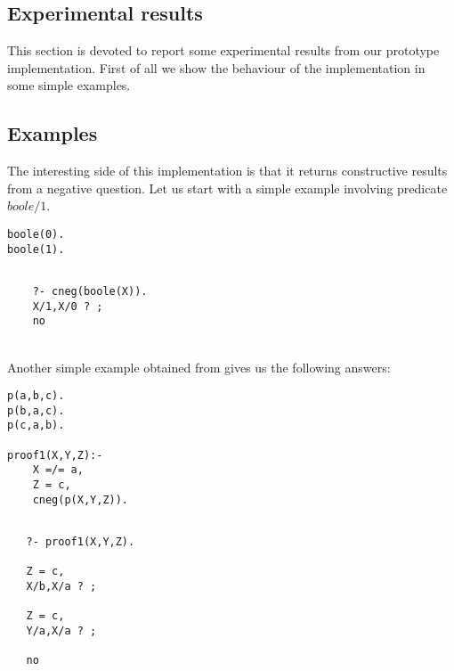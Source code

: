 \documentclass{llncs}
\begin{document}
\subsection{Experimental results}
\label{results}
This section is devoted to report some experimental results from our
prototype implementation.  First of all we show the behaviour of the
implementation in some simple examples.


\subsection{Examples}
\label{examples}

The interesting side of this implementation is that it returns
constructive results from a negative question. Let us start with a
simple example involving predicate $boole/1$.

\begin{minipage}{2in}
\begin{verbatim}
boole(0).
boole(1).
\end{verbatim}
\end{minipage}
\begin{minipage}{2in}
\begin{verbatim} 

    ?- cneg(boole(X)).
    X/1,X/0 ? ;
    no
\end{verbatim} 
\end{minipage}\\

Another simple example obtained from \cite{Stuckey95} gives us the
following answers:

\begin{minipage}{2in}
\begin{verbatim}
p(a,b,c).
p(b,a,c).
p(c,a,b).

proof1(X,Y,Z):-
    X =/= a,
    Z = c,
    cneg(p(X,Y,Z)).
\end{verbatim}
\end{minipage}
\begin{minipage}{2in}
\begin{verbatim} 

   ?- proof1(X,Y,Z).

   Z = c,
   X/b,X/a ? ;

   Z = c,
   Y/a,X/a ? ;

   no
\end{verbatim} 
\end{minipage}\\
\end{document}
